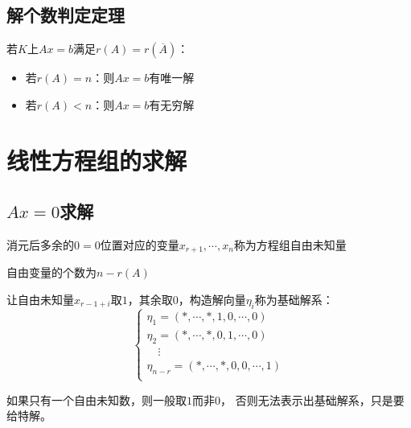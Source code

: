 \subsection{解个数判定定理}

\begin{theorem}[解个数判定定理]
  若$K$上$Ax = b$满足$r(A) = r(\overline{A})$：
  \begin{itemize}
  \item 若$r(A) = n$：则$Ax = b$有唯一解
  \item 若$r(A) < n$：则$Ax = b$有无穷解
  \end{itemize}
\end{theorem}



\section{线性方程组的求解}

\subsection{$Ax = 0$求解}

\begin{definition}[自由未知量]
  消元后多余的$0 = 0$位置对应的变量$x_{r+1},\cdots,x_n$称为方程组自由未知量
\end{definition}

\begin{theorem}[自由变量的个数]
  自由变量的个数为$n - r(A)$
\end{theorem}

\begin{definition}[基础解系]
  让自由未知量$x_{r-1+i}$取$1$，其余取$0$，构造解向量$\eta_i$称为基础解系：
  \begin{equation*}
    \begin{cases}
      \eta_1 = (*,\cdots,*,1,0,\cdots,0)\\
      \eta_2 = (*,\cdots,*,0,1,\cdots,0)\\
      \quad \vdots\\
      \eta_{n-r} = (*,\cdots,*,0,0,\cdots,1)\\
    \end{cases}
  \end{equation*}
\end{definition}

\begin{note}
  如果只有一个自由未知数，则一般取$1$而非$0$，
  否则无法表示出基础解系，只是要给特解。
\end{note}

